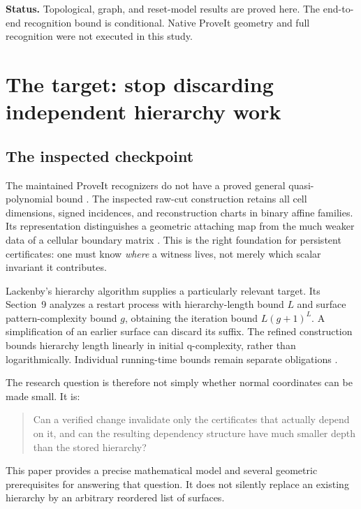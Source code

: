 \documentclass[11pt]{article}
\theoremstyle{definition}
\begin{document}
\begin{titlepage}
\begin{abstract}
The contribution includes proofs, a standard-library reference implementation, independent verifiers, exhaustive and randomized finite checks, and paired graph-stage measurements. It does not establish a general quasi-polynomial unknot recognizer. In particular, an initial knot exterior permits a nonseparating batch of size at most one. The remaining challenge is to realize source-authenticated persistence with small actual causal depth, controlled encoded geometry, and the original hierarchy's correctness obligations intact.
\end{abstract}
\vfill
{\small\textbf{Status.} Topological, graph, and reset-model results are proved here. The end-to-end recognition bound is conditional. Native ProveIt geometry and full recognition were not executed in this study.}
\end{titlepage}
\tableofcontents
\clearpage

\section{The target: stop discarding independent hierarchy work}
\subsection{The inspected checkpoint}
The maintained ProveIt recognizers do not have a proved general quasi-polynomial bound \cite{repo}. The inspected raw-cut construction retains all cell dimensions, signed incidences, and reconstruction charts in binary affine families. Its representation distinguishes a geometric attaching map from the much weaker data of a cellular boundary matrix \cite{cutcells}. This is the right foundation for persistent certificates: one must know \emph{where} a witness lives, not merely which scalar invariant it contributes.

Lackenby's hierarchy algorithm supplies a particularly relevant target. Its Section~9 analyzes a restart process with hierarchy-length bound $L$ and surface pattern-complexity bound $g$, obtaining the iteration bound $L(g+1)^L$. A simplification of an earlier surface can discard its suffix. The refined construction bounds hierarchy length linearly in initial q-complexity, rather than logarithmically. Individual running-time bounds remain separate obligations \cite[Sections~9--10]{lackenby}.

The research question is therefore not simply whether normal coordinates can be made small. It is:
\begin{quote}
Can a verified change invalidate only the certificates that actually depend on it, and can the resulting dependency structure have much smaller depth than the stored hierarchy?
\end{quote}
This paper provides a precise mathematical model and several geometric prerequisites for answering that question. It does not silently replace an existing hierarchy by an arbitrary reordered list of surfaces.
\end{document}
